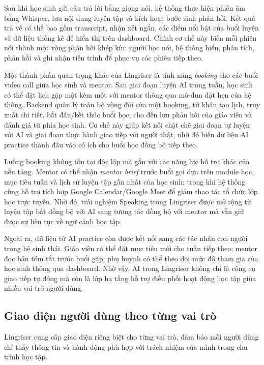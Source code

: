 Sau khi học sinh gửi câu trả lời bằng giọng nói, hệ thống thực hiện phiên âm bằng Whisper, lưu nội dung luyện tập và kích hoạt bước sinh phản hồi. Kết quả trả về có thể bao gồm transcript, nhận xét ngắn, các điểm nổi bật của buổi luyện và dữ liệu thống kê để hiển thị trên dashboard. Chính cơ chế này biến mỗi phiên nói thành một vòng phản hồi khép kín: người học nói, hệ thống hiểu, phân tích, phản hồi và ghi nhận tiến trình để phục vụ các phiên tiếp theo.

Một thành phần quan trọng khác của Lingriser là tính năng \textit{booking} cho các buổi video call giữa học sinh và mentor. Sau giai đoạn luyện AI trong tuần, học sinh có thể đặt lịch gặp một kèm một với mentor thông qua mô-đun đặt hẹn của hệ thống. Backend quản lý toàn bộ vòng đời của một booking, từ khâu tạo lịch, truy xuất chi tiết, bắt đầu/kết thúc buổi học, cho đến lưu phản hồi của giáo viên và đánh giá từ phía học sinh. Cơ chế này giúp kết nối chặt chẽ giai đoạn tự luyện với AI và giai đoạn thực hành giao tiếp với người thật, nhờ đó biến dữ liệu AI practice thành đầu vào có ích cho buổi học đồng bộ tiếp theo.

Luồng booking không tồn tại độc lập mà gắn với các năng lực hỗ trợ khác của nền tảng. Mentor có thể nhận \textit{mentor brief} trước buổi gọi dựa trên module học, mục tiêu tuần và lịch sử luyện tập gần nhất của học sinh; trong khi hệ thống cũng hỗ trợ tích hợp Google Calendar/Google Meet để giảm thao tác tổ chức lớp học trực tuyến. Nhờ đó, trải nghiệm Speaking trong Lingriser được mở rộng từ luyện tập bất đồng bộ với AI sang tương tác đồng bộ với mentor mà vẫn giữ được sự liên tục về ngữ cảnh học tập.

Ngoài ra, dữ liệu từ AI practice còn được kết nối sang các tác nhân con người trong hệ sinh thái. Giáo viên có thể đặt mục tiêu mới cho tuần tiếp theo; mentor đọc bản tóm tắt trước buổi gặp; phụ huynh có thể theo dõi mức độ tham gia của học sinh thông qua dashboard. Nhờ vậy, AI trong Lingriser không chỉ là công cụ giao tiếp tự động mà còn là lớp hạ tầng hỗ trợ điều phối hoạt động học tập giữa nhiều vai trò người dùng.

\subsection{Giao diện người dùng theo từng vai trò}

Lingriser cung cấp giao diện riêng biệt cho từng vai trò, đảm bảo mỗi người dùng chỉ thấy thông tin và hành động phù hợp với trách nhiệm của mình trong chu trình học tập.

